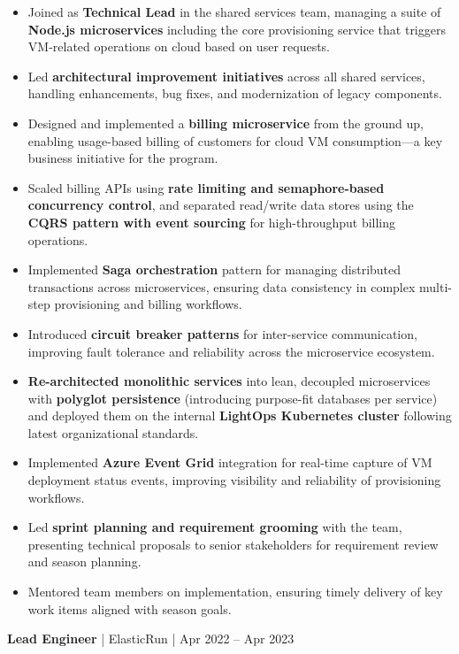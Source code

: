 \documentclass[a4paper,11pt]{article}
\newcommand{\jobtitle}[4]{
  \vspace{6pt}
  {\textbf{\textcolor{accent}{#1}} | #2 | #3}
  \vspace{2pt}
}
\begin{document}
\begin{itemize}[leftmargin=*, nosep]
  \item Joined as \textbf{Technical Lead} in the shared services team, managing a suite of \textbf{Node.js microservices} including the core provisioning service that triggers VM-related operations on cloud based on user requests.
  \item Led \textbf{architectural improvement initiatives} across all shared services, handling enhancements, bug fixes, and modernization of legacy components.
  \item Designed and implemented a \textbf{billing microservice} from the ground up, enabling usage-based billing of customers for cloud VM consumption---a key business initiative for the program.
  \item Scaled billing APIs using \textbf{rate limiting and semaphore-based concurrency control}, and separated read/write data stores using the \textbf{CQRS pattern with event sourcing} for high-throughput billing operations.
  \item Implemented \textbf{Saga orchestration} pattern for managing distributed transactions across microservices, ensuring data consistency in complex multi-step provisioning and billing workflows.
  \item Introduced \textbf{circuit breaker patterns} for inter-service communication, improving fault tolerance and reliability across the microservice ecosystem.
  \item \textbf{Re-architected monolithic services} into lean, decoupled microservices with \textbf{polyglot persistence} (introducing purpose-fit databases per service) and deployed them on the internal \textbf{LightOps Kubernetes cluster} following latest organizational standards.
  \item Implemented \textbf{Azure Event Grid} integration for real-time capture of VM deployment status events, improving visibility and reliability of provisioning workflows.
  \item Led \textbf{sprint planning and requirement grooming} with the team, presenting technical proposals to senior stakeholders for requirement review and season planning.
  \item Mentored team members on implementation, ensuring timely delivery of key work items aligned with season goals.
\end{itemize}

\vspace{8pt}
\jobtitle{Lead Engineer}{ElasticRun}{Apr 2022 -- Apr 2023}{}
\end{document}
